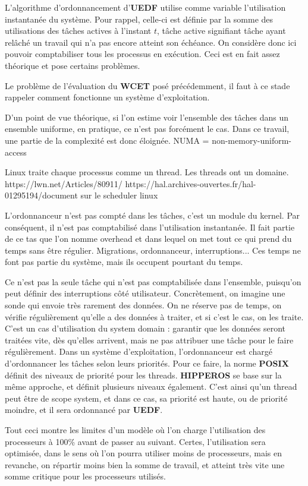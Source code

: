 	L'algorithme d'ordonnancement d'\textbf{UEDF} utilise comme variable l'utilisation instantanée du système. 
	Pour rappel, celle-ci est définie par la somme des utilisations des tâches actives à l'instant $t$, 
	tâche active signifiant tâche ayant relâché un travail qui n'a pas encore atteint son échéance. 
	On considère donc ici pouvoir comptabiliser tous les processus en exécution. Ceci est 
	en fait assez théorique et pose certains problèmes.
	
	Le problème de l'évaluation du \textbf{WCET} posé précédemment, il faut à ce stade rappeler comment 
	fonctionne un système d'exploitation.
	
	D'un point de vue théorique, si l'on estime voir l'ensemble des tâches dans un ensemble uniforme, 
	en pratique, ce n'est pas forcément le cas. Dans ce travail, une partie de la complexité est 
	donc éloignée. NUMA = non-memory-uniform-access
	
	Linux traite chaque processus comme un thread. Les threads ont un domaine. 
	https://lwn.net/Articles/80911/
	https://hal.archives-ouvertes.fr/hal-01295194/document  sur le scheduler linux
	

	L'ordonnanceur n'est pas compté dans les tâches, c'est un module du kernel. Par conséquent, il n'est pas comptabilisé 
	dans l'utilisation instantanée. Il fait partie de ce tas que l'on nomme \og{}overhead\fg{} et dans lequel 
	on met tout ce qui prend du temps sans être régulier. 
	Migrations, ordonnanceur, interruptions... Ces temps ne font pas partie du système, mais ils occupent
	pourtant du temps.
	
	Ce n'est pas la seule tâche qui n'est pas comptabilisée dans l'ensemble, puisqu'on peut définir des 
	interruptions côté utilisateur. 
	Concrètement, on imagine une sonde qui envoie très rarement des données. On ne réserve 
	pas de temps, on vérifie régulièrement qu'elle a des données à traiter, et si c'est le cas, on les traite.\\
	C'est un cas d'utilisation du system domain : garantir que les données seront traitées vite, dès qu'elles arrivent, 
	mais ne pas attribuer une tâche pour le faire régulièrement.
	Dans un système d'exploitation, l'ordonnanceur est chargé d'ordonnancer les tâches selon leurs priorités. 
	Pour ce faire, la norme \textbf{POSIX} définit des niveaux de priorité pour les threads. 
	\textbf{HIPPEROS }se base sur la même approche, et définit plusieurs niveaux également. C'est ainsi 
	qu'un thread peut être de scope system, et dans ce cas, sa priorité est haute, ou de priorité 
	moindre, et il sera ordonnancé par \textbf{UEDF}.\newline
	
	Tout ceci montre les limites d'un modèle où l'on charge l'utilisation des processeurs à 100\% avant de 
	passer au suivant. Certes, l'utilisation sera optimisée, dans le sens où l'on 
	pourra utiliser moins de processeurs, mais en revanche, on 
	répartir moins bien la somme de travail, et atteint très vite une somme critique pour les processeurs utilisés.
